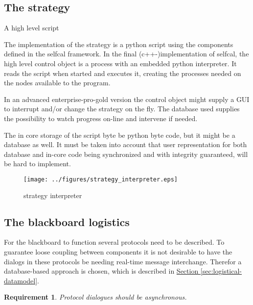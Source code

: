 \documentclass[]{lofar}
\newtheorem{requirement}{Requirement}[subsection]
\begin{document}
    \subsection{The strategy}{A high level script}
    \label{subsec:strategy}\hypertarget{subsec:strategy}{}

      The implementation of the strategy is a python script using the
      components defined in the selfcal framework. In the final
      (c++-)implementation of selfcal, the high level control object
      is a process with an embedded python interpreter. It reads the
      script when started and executes it, creating the processes
      needed on the nodes available to the program.

      In an advanced enterprise-pro-gold version the control object
      might supply a GUI to interrupt and/or change the strategy on
      the fly. The database used supplies the possibility to watch
      progress on-line and intervene if needed.

      The in core storage of the script byte be python byte code, but
      it might be a database as well. It must be taken into account
      that user representation for both database and in-core code
      being synchronized and with integrity guaranteed, will be hard
      to implement.

      \begin{figure}
        \texttt{[image: ../figures/strategy\_interpreter.eps]}
        \hypertarget{fig:strategy_interpreter}{}
        \caption{strategy interpreter\label{fig:strategy_interpreter}}
      \end{figure}

    \subsection{The blackboard logistics}
    \label{subsec:blackboard-logistics}\hypertarget{subsec:blackboard-logistics}{}

      For the blackboard to function several protocols need to be
      described. To guarantee loose coupling between components it is
      not desirable to have the dialogs in these protocols be needing
      real-time message interchange. Therefor a database-based
      approach is chosen, which is described in
      \hyperlink{sec:logistical-datamodel}{Section
      \ref{sec:logistical-datamodel}}.

      \begin{requirement}
        Protocol dialogues should be asynchronous.
        \label{req:asynchronous}
      \end{requirement}
\end{document}
